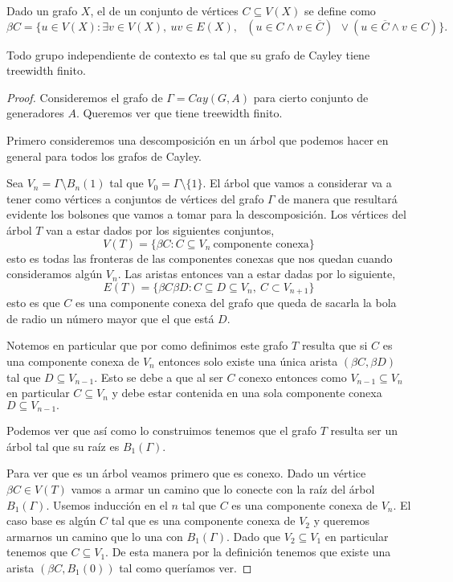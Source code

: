 \documentclass[tesis.tex]{subfiles}
\begin{document}
\begin{deff}
	Dado un grafo $X$, el  de un conjunto de vértices $C \subseteq V(X)$ se define como
	\[
	\beta C = \{ u \in V(X) : \exists v \in V(X), \ uv \in E(X), \  \ \ (u \in C \wedge v \in \overline C) \ \ \lor  (u \in \overline C \wedge v \in  C)   \}.
	\] 
\end{deff}

\begin{teo}
	Todo grupo independiente de contexto es tal que su grafo de Cayley tiene treewidth finito.
\end{teo}
\begin{proof}
Consideremos el grafo de $\Gamma = Cay(G,A)$ para cierto conjunto de generadores $A$. Queremos ver que tiene treewidth finito.
	
Primero consideremos una descomposición en un árbol que podemos hacer en general para todos los grafos de Cayley. 

Sea $V_n = \Gamma \setminus B_n(1) $ tal que $V_0 = \Gamma \setminus \{1\}$. 
El árbol que vamos a considerar va a tener como vértices a conjuntos de vértices del grafo $\Gamma$ de manera que resultará evidente los bolsones que vamos a tomar para la descomposición. 
Los vértices del árbol $T$ van a estar dados por los siguientes conjuntos,
\[
V(T) = \{  \beta C : C \subseteq V_n \ \text{componente conexa}   \}
\]
esto es todas las fronteras de las componentes conexas que nos quedan cuando consideramos algún $V_n$. 
Las aristas entonces van a estar dadas por lo siguiente,
\[
E(T) = \{ \beta C \beta D : C \subseteq D \subseteq V_n, \ C \subset V_{n+1}   \}
\]
esto es que $C$ es una componente conexa del grafo que queda de sacarla la bola de radio un número mayor que el que está $D$.

Notemos en particular que por como definimos este grafo $T$ resulta que si $C$ es una componente conexa de $V_n$ entonces solo existe una única arista $(\beta C, \beta D)$ tal que $D \subseteq V_{n-1}$. 
Esto se debe a que al ser $C$ conexo entonces como $V_{n-1} \subseteq V_{n}$ en particular $C \subseteq V_{n}$ y debe estar contenida en una sola componente conexa $D \subseteq V_{n-1}.$


Podemos ver que así como lo construimos tenemos que el grafo $T$ resulta ser un árbol tal que su raíz es $B_1(\Gamma)$. 

Para ver que es un árbol veamos primero que es conexo. Dado un vértice $\beta C \in V(T)$ vamos a armar un camino que lo conecte con la raíz del árbol $B_1(\Gamma)$. 
Usemos inducción en el $n$ tal que $C$ es una componente conexa de $V_n$. 
El caso base es algún $C$ tal que es una componente conexa de $V_2$ y queremos armarnos un camino que lo una con $B_1(\Gamma)$. 
Dado que $V_2 \subseteq V_1$ en particular tenemos que $C \subseteq V_1$. De esta manera por la definición tenemos que existe una arista $(\beta C, B_1(0))$ tal como queríamos ver.


\end{proof}
\end{document}
